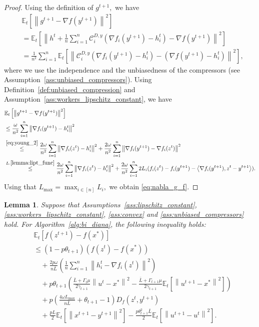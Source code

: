 \documentclass{article} %
\newcommand{\norm}[1]{\left\| #1 \right\|}
\newcommand{\inp}[2]{\left\langle#1,#2\right\rangle} %
\newcommand{\ExpSub}[2]{{\mathbb{E}}_{#1}\left[#2\right]}
\newcommand{\cC}{\mathcal{C}}
\theoremstyle{plain}
\newtheorem{lemma}[theorem]{Lemma}
\theoremstyle{definition}
\theoremstyle{remark}
\begin{document}
\begin{proof}
  Using the definition of $g^{t+1},$ we have
  \begin{align*}
    &\ExpSub{t}{\norm{g^{t+1} - \nabla f(y^{t+1})}^2} \\ 
    &=\ExpSub{t}{\norm{h^t + \frac{1}{n}\sum_{i=1}^n \cC_i^{D, y}(\nabla f_i(y^{t+1}) - h_i^t) - \nabla f(y^{t+1})}^2} \\
    &=\frac{1}{n^2} \sum_{i=1}^n \ExpSub{t}{\norm{\cC_i^{D, y}(\nabla f_i(y^{t+1}) - h_i^t) - \left(\nabla f(y^{t+1}) - h_i^t\right)}^2},
  \end{align*}
  where we use the independence and the unbiasedness of the compressors (see Assumption~\ref{ass:unbiased_compressors}). Using Definition~\ref{def:unbiased_compression} and Assumption~\ref{ass:workers_lipschitz_constant}, we have
  \begin{equation*}
  \begin{aligned}
    &\ExpSub{t}{\norm{g^{t+1} - \nabla f(y^{t+1})}^2} \\ 
    &\leq\frac{\omega}{n^2} \sum_{i=1}^n \norm{\nabla f_i(y^{t+1}) - h_i^t}^2 \\
    &\overset{\eqref{eq:young_2}}{\leq}\frac{2 \omega}{n^2} \sum_{i=1}^n \norm{\nabla f_i(z^{t}) - h_i^t}^2 + \frac{2 \omega}{n^2} \sum_{i=1}^n \norm{\nabla f_i(y^{t+1}) - \nabla f_i(z^{t})}^2 \\
    &\overset{L.\ref{lemma:lipt_func}}{\leq}\frac{2 \omega}{n^2} \sum_{i=1}^n \norm{\nabla f_i(z^{t}) - h_i^t}^2 + \frac{2 \omega}{n^2} \sum_{i=1}^n 2L_i (f_i(z^t) - f_i(y^{t+1}) - \inp{\nabla f_i(y^{t+1})}{z^t - y^{t+1}}).
  \end{aligned}
  \end{equation*}
  Using that $L_{\max} = \max_{i \in [n]} L_i,$ we obtain \eqref{eq:nabla_g_f}.
\end{proof}

\begin{lemma}
  \label{lemma:aux_first}
  Suppose that Assumptions~\ref{ass:lipschitz_constant}, \ref{ass:workers_lipschitz_constant}, \ref{ass:convex} and \ref{ass:unbiased_compressors} hold. For Algorithm~\ref{alg:bi_diana}, the following inequality holds:
  \begin{align*}
    &\ExpSub{t}{f(z^{t+1}) - f(x^*)} \\
    &\leq (1 - p\theta_{t+1}) \left(f(z^{t}) - f(x^*)\right) \\
    &\quad + \frac{2 p \omega}{n \bar{L}} \left(\frac{1}{n}\sum_{i=1}^n \norm{h_i^t - \nabla f_i(z^{t})}^2\right) \\
    &\quad+ p\theta_{t+1} \left(\frac{\bar{L} + \Gamma_{t} \mu}{2 \gamma_{t+1}} \norm{u^t - x^*}^2 - \frac{\bar{L} + \Gamma_{t+1} \mu}{2 \gamma_{t+1}} \ExpSub{t}{\norm{u^{t+1} - x^*}^2}\right) \\
    &\quad+ p\left(\frac{4 \omega L_{\max}}{n \bar{L}} + \theta_{t+1} - 1 \right) D_f(z^t, y^{t+1}) \\
    &\quad+ \frac{pL}{2} \ExpSub{t}{\norm{x^{t+1} - y^{t+1}}^2} - \frac{p \theta_{t+1}^2 \bar{L}}{2} \ExpSub{t}{\norm{u^{t+1} - u^t}^2}.
  \end{align*}
\end{lemma}
\end{document}
